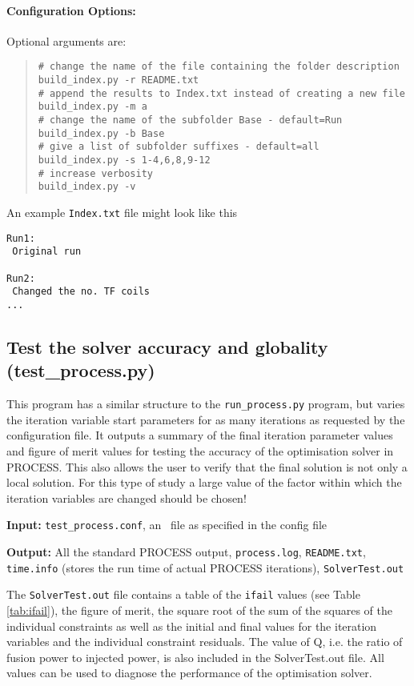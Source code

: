 \paragraph{Configuration Options:}

Optional arguments are:
\begin{quote}
\begin{verbatim}
# change the name of the file containing the folder description
build_index.py -r README.txt
# append the results to Index.txt instead of creating a new file
build_index.py -m a
# change the name of the subfolder Base - default=Run
build_index.py -b Base
# give a list of subfolder suffixes - default=all
build_index.py -s 1-4,6,8,9-12
# increase verbosity
build_index.py -v
\end{verbatim}
\end{quote}

An example \texttt{Index.txt} file might look like this
\begin{framed}
\begin{verbatim}
Run1:
 Original run

Run2:
 Changed the no. TF coils
...
\end{verbatim}
\end{framed}

\subsection{Test the solver accuracy and globality (test\_process.py)}

This program has a similar structure to the \texttt{run\_process.py} program, but varies the iteration variable start parameters for as many iterations as requested by the configuration file. It outputs a summary of the final iteration parameter values and figure of merit values for testing the accuracy of the optimisation solver in PROCESS. This also allows the user to verify that the final solution is not only a local solution. For this type of study a large value of the factor within which the iteration variables are changed should be chosen! 

\begin{description}
\item{\textbf{Input:}}
\texttt{test\_process.conf}, an \indat\ file as specified in the config file

\item{\textbf{Output:}} All the standard
  PROCESS output, \texttt{process.log}, \texttt{README.txt}, \texttt{time.info} (stores the run time of actual PROCESS iterations), \texttt{SolverTest.out}
\end{description}
The \texttt{SolverTest.out} file contains a table of the \texttt{ifail} values (see Table \ref{tab:ifail}), the figure of merit, the square root of the sum of the squares of the individual constraints as well as the initial and final values for the iteration variables and the individual constraint residuals. The value of Q, i.e. the ratio of
fusion power to injected power, is also included in the SolverTest.out file. All values can be used to diagnose the performance of the optimisation solver.


